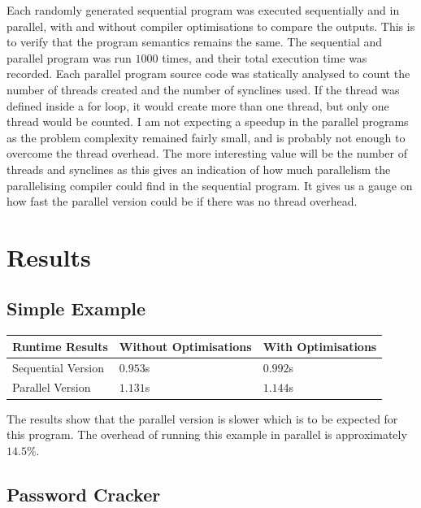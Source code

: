 Each randomly generated sequential program was executed sequentially and in parallel, with and without compiler optimisations to compare the outputs. This is to verify that the program semantics remains the same. The sequential and parallel program was run $1000$ times, and their total execution time was recorded. Each parallel program source code was statically analysed to count the number of threads created and the number of synclines used. If the thread was defined inside a for loop, it would create more than one thread, but only one thread would be counted. I am not expecting a speedup in the parallel programs as the problem complexity remained fairly small, and is probably not enough to overcome the thread overhead. The more interesting value will be the number of threads and synclines as this gives an indication of how much parallelism the parallelising compiler could find in the sequential program. It gives us a gauge on how fast the parallel version could be if there was no thread overhead.

\section{Results}
\subsection{Simple Example}

\begin{tabularx}{\textwidth}{ | >{\centering\arraybackslash}X | >{\centering\arraybackslash}X | >{\centering\arraybackslash}X |}
	\hline
    Runtime Results & Without Optimisations & With Optimisations \\
    \hline
    Sequential Version & $0.953$s & $0.992$s \\
    \hline
    Parallel Version   & $1.131$s & $1.144$s \\
    \hline
\end{tabularx}

The results show that the parallel version is slower which is to be expected for this program. The overhead of running this example in parallel is approximately $14.5\%$.

\subsection{Password Cracker}
\label{sec:evaluation-results-password-cracker}

